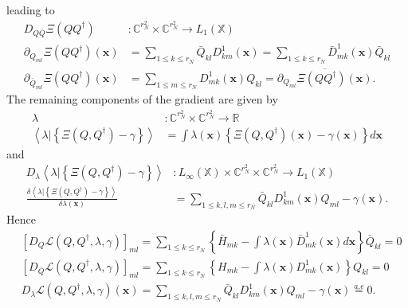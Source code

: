 \documentclass[aps,preprint]{revtex4}%
\begin{document}
leading to
\begin{align}
D_{Q\bar{Q}}\Xi\left(  QQ^{\dagger}\right)   &  :\mathbb{C}^{r_{N}^{2}}%
\times\mathbb{C}^{r_{N}^{2}}\rightarrow L_{1}\left(  \mathbb{X}\right)
\nonumber\\
\partial_{Q_{ml}}\Xi\left(  QQ^{\dagger}\right)  \left(  \mathbf{x}\right)
&  =\sum_{1\leq k\leq r_{N}}\bar{Q}_{kl}D_{km}^{1}\left(  \mathbf{x}\right)
=\sum_{1\leq k\leq r_{N}}\bar{D}_{mk}^{1}\left(  \mathbf{x}\right)  \bar
{Q}_{kl}\nonumber\\
\partial_{\bar{Q}_{ml}}\Xi\left(  QQ^{\dagger}\right)  \left(  \mathbf{x}%
\right)   &  =\sum_{1\leq m\leq r_{N}}D_{mk}^{1}\left(  \mathbf{x}\right)
Q_{kl}=\overline{\partial_{Q_{ml}}\Xi\left(  QQ^{\dagger}\right)  \left(
\mathbf{x}\right)  }.
\end{align}
The remaining components of the gradient are given by
\begin{align}
\lambda &  :\mathbb{C}^{r_{N}^{2}}\times\mathbb{C}^{r_{N}^{2}}\rightarrow
\mathbb{R}\nonumber\\
\left\langle \left.  \lambda\right\vert \left\{  \Xi\left(  Q,Q^{\dagger
}\right)  -\gamma\right\}  \right\rangle  &  =\int\lambda\left(
\mathbf{x}\right)  \left\{  \Xi\left(  Q,Q^{\dagger}\right)  \left(
\mathbf{x}\right)  -\gamma\left(  \mathbf{x}\right)  \right\}  d\mathbf{x}%
\end{align}
and
\begin{align}
D_{\lambda}\left\langle \left.  \lambda\right\vert \left\{  \Xi\left(
Q,Q^{\dagger}\right)  -\gamma\right\}  \right\rangle  &  :L_{\infty}\left(
\mathbb{X}\right)  \times\mathbb{C}^{r_{N}^{2}}\times\mathbb{C}^{r_{N}^{2}%
}\rightarrow L_{1}\left(  \mathbb{X}\right)  \nonumber\\
\frac{\delta\left\langle \left.  \lambda\right\vert \left\{  \Xi\left(
Q,Q^{\dagger}\right)  -\gamma\right\}  \right\rangle }{\delta\lambda\left(
\mathbf{x}\right)  } &  =\sum_{1\leq k,l,m\leq r_{N}}\bar{Q}_{kl}D_{km}%
^{1}\left(  \mathbf{x}\right)  Q_{ml}-\gamma\left(  \mathbf{x}\right)  .
\end{align}
Hence
\begin{align}
&  \left[  D_{Q}\mathcal{L}\left(  Q,Q^{\dagger},\lambda,\gamma\right)
\right]  _{ml}=\sum_{1\leq k\leq r_{N}}\left\{  \bar{H}_{mk}-\int
\lambda\left(  \mathbf{x}\right)  \bar{D}_{mk}^{1}\left(  \mathbf{x}\right)
d\mathbf{x}\right\}  \bar{Q}_{kl}=0\nonumber\\
&  \left[  D_{\bar{Q}}\mathcal{L}\left(  Q,Q^{\dagger},\lambda,\gamma\right)
\right]  _{ml}=\sum_{1\leq k\leq r_{N}}\left\{  H_{mk}-\int\lambda\left(
\mathbf{x}\right)  D_{mk}^{1}\left(  \mathbf{x}\right)  \right\}
Q_{kl}=0\nonumber\\
&  D_{\lambda}\mathcal{L}\left(  Q,Q^{\dagger},\lambda,\gamma\right)  \left(
\mathbf{x}\right)  =\sum_{1\leq k,l,m\leq r_{N}}\bar{Q}_{kl}D_{km}^{1}\left(
\mathbf{x}\right)  Q_{ml}-\gamma\left(  \mathbf{x}\right)  \overset{a.e}{=}0.
\end{align}
\end{document}
